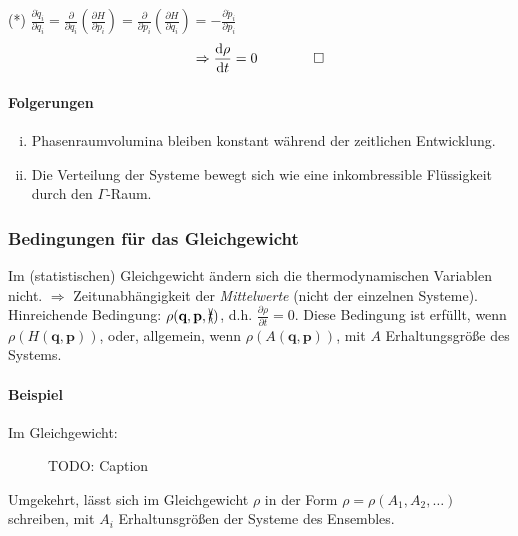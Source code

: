 (*) $\frac{\partial \dot{q}_i}{\partial q_i} = \frac{\partial}{\partial q_i} \left( \frac{\partial H}{\partial p_i} \right) = \frac{\partial}{\partial p_i} \left( \frac{\partial H}{\partial q_i} \right) = - \frac{\partial \dot{p}_i}{\partial p_i}$
\begin{equation}
    \Rightarrow \frac{\mathrm{d} \rho}{\mathrm{d} t} = 0 \qquad \qquad \square
\end{equation}
\paragraph{Folgerungen}
\begin{enumerate}[i)]
    \item Phasenraumvolumina bleiben konstant während der zeitlichen Entwicklung.
    \item Die Verteilung der Systeme bewegt sich wie eine inkombressible Flüssigkeit durch den $\Gamma$-Raum.
\end{enumerate}
\subsubsection{Bedingungen für das Gleichgewicht}
Im (statistischen) Gleichgewicht ändern sich die thermodynamischen Variablen nicht. $\Rightarrow$ Zeitunabhängigkeit der \emph{Mittelwerte}
(nicht der einzelnen Systeme). Hinreichende Bedingung: $\rho(\textbf{q}, \textbf{p}, \xcancel{t})$, d.h. $\frac{\partial \rho}{\partial t} = 0$.
Diese Bedingung ist erfüllt, wenn $\rho(H(\textbf{q}, \textbf{p}))$, oder, allgemein, wenn $\rho(A(\textbf{q}, \textbf{p}))$, mit $A$ Erhaltungsgröße
des Systems.
\paragraph{Beispiel} Im Gleichgewicht:

\begin{figure}[H]
    \centering
    \def\svgwidth{0.5\textwidth}
    
    \caption{TODO: Caption}  %
    \label{img:phaseSpaceBall}
\end{figure}

Umgekehrt, lässt sich im Gleichgewicht $\rho$ in der Form $\rho=\rho(A_1, A_2, \ldots)$ schreiben, mit $A_i$ Erhaltunsgrößen der Systeme des Ensembles.

